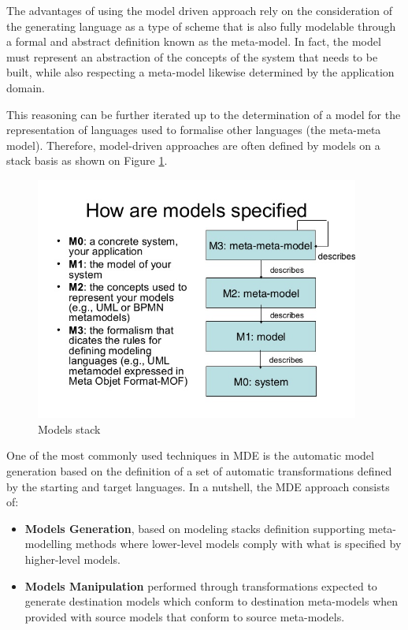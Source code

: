 The advantages of using the model driven approach rely on the consideration of the generating language as a type of scheme that is also fully modelable through a formal and abstract definition known as the meta-model. In fact, the model must represent an abstraction of the concepts of the system that needs to be built, while also respecting a meta-model likewise determined by the application domain.

This reasoning can be further iterated up to the determination of a model for the representation of languages used to formalise other languages (the meta-meta model). Therefore, model-driven approaches are often defined by models on a stack basis as shown on Figure \ref{fig:mde}.

\vspace{0cm}
\begin{figure}[htbp]
  \centering
    \includegraphics[height=8cm]{images/mde}
  \caption{Models stack}
  \label{fig:mde}
\end{figure}
\vspace{0cm}

One of the most commonly used techniques in MDE is the automatic model generation based on the definition of a set of automatic transformations defined by the starting and target languages. In a nutshell, the MDE approach consists of:

\begin{itemize}
  \item \textbf{Models Generation}, based on modeling stacks definition supporting meta-modelling methods where lower-level models comply with what is specified by higher-level models.

  \item \textbf{Models Manipulation} performed through transformations expected to generate destination models which conform to destination meta-models when provided with source models that conform to source meta-models.
\end{itemize} 


